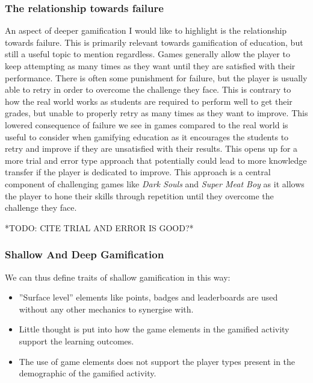 \subsubsection{The relationship towards failure}
An aspect of deeper gamification I would like to highlight is the relationship towards failure. This is primarily relevant towards gamification of education, but still a useful topic to mention regardless. Games generally allow the player to keep attempting as many times as they want until they are satisfied with their performance. There is often some punishment for failure, but the player is usually able to retry in order to overcome the challenge they face. This is contrary to how the real world works as students are required to perform well to get their grades, but unable to properly retry as many times as they want to improve. This lowered consequence of failure we see in games compared to the real world is useful to consider when gamifying education as it encourages the students to retry and improve if they are unsatisfied with their results. 
This opens up for a more trial and error type approach that potentially could lead to more knowledge transfer if the player is dedicated to improve. This approach is a central component of challenging games like \emph{Dark Souls} and \emph{Super Meat Boy} as it allows the player to hone their skills through repetition until they overcome the challenge they face. 

*TODO: CITE TRIAL AND ERROR IS GOOD?*

\subsubsection{Shallow And Deep Gamification}
We can thus define traits of shallow gamification in this way:
\begin{itemize}
    \item ''Surface level'' elements like points, badges and leaderboards are used without any other mechanics to synergise with.
    \item Little thought is put into how the game elements in the gamified activity support the learning outcomes. 
    \item The use of game elements does not support the player types present in the demographic of the gamified activity. 
\end{itemize}

